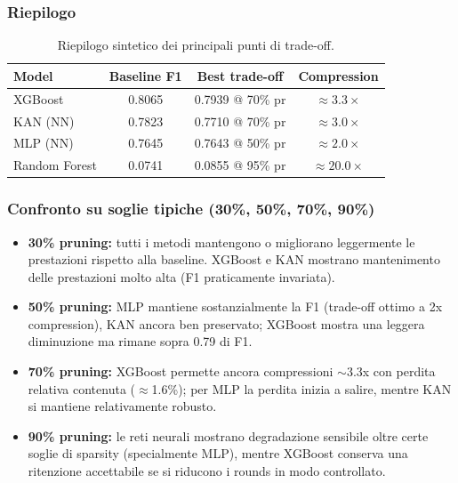 \documentclass[a4paper,12pt]{report}
\begin{document}
	\subsubsection{Riepilogo}
	\begin{table}[H]
		\centering
		\begin{tabular}{lccc}
			\toprule
			\textbf{Model} & \textbf{Baseline F1} & \textbf{Best trade-off} & \textbf{Compression} \\
			\midrule
			XGBoost       & 0.8065 & 0.7939 @ 70\% pr & \(\approx 3.3\times\) \\
			KAN (NN)      & 0.7823 & 0.7710 @ 70\% pr & \(\approx 3.0\times\) \\
			MLP (NN)      & 0.7645 & 0.7643 @ 50\% pr & \(\approx 2.0\times\) \\
			Random Forest & 0.0741 & 0.0855 @ 95\% pr & \(\approx 20.0\times\) \\
			\bottomrule
		\end{tabular}
		\caption{Riepilogo sintetico dei principali punti di trade-off.}
	\end{table}
	
	\subsubsection{Confronto su soglie tipiche (30\%, 50\%, 70\%, 90\%)}
	\begin{itemize}
		\item \textbf{30\% pruning:} tutti i metodi mantengono o migliorano leggermente le prestazioni rispetto alla baseline. XGBoost e KAN mostrano mantenimento delle prestazioni molto alta (F1 praticamente invariata).
		\item \textbf{50\% pruning:} MLP mantiene sostanzialmente la F1 (trade-off ottimo a 2x compression), KAN ancora ben preservato; XGBoost mostra una leggera diminuzione ma rimane sopra 0.79 di F1.
		\item \textbf{70\% pruning:} XGBoost permette ancora compressioni \(\sim\)3.3x con perdita relativa contenuta (\(\approx\)1.6\%); per MLP la perdita inizia a salire, mentre KAN si mantiene relativamente robusto.
		\item \textbf{90\% pruning:} le reti neurali mostrano degradazione sensibile oltre certe soglie di sparsity (specialmente MLP), mentre XGBoost conserva una ritenzione accettabile se si riducono i rounds in modo controllato.
	\end{itemize}
	
\end{document}
